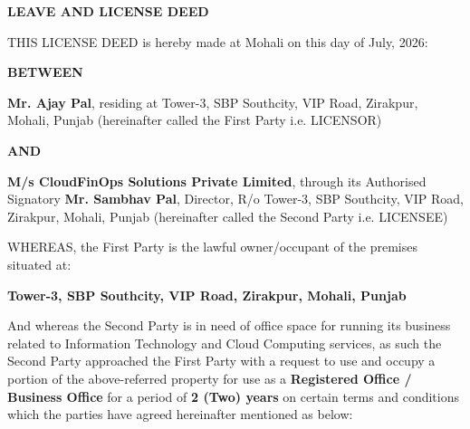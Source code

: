 \documentclass[a4paper,12pt]{article}
\begin{document}
\begin{center}
{\Large\bfseries LEAVE AND LICENSE DEED}
\end{center}

\vspace{0.8cm}

THIS LICENSE DEED is hereby made at Mohali on this \underline{\hspace{2cm}} day of July, 2026:

\vspace{0.5cm}

\noindent\textbf{BETWEEN}

\vspace{0.3cm}

\noindent\textbf{Mr. Ajay Pal}, residing at Tower-3, SBP Southcity, VIP Road, Zirakpur, Mohali, Punjab (hereinafter called the First Party i.e. LICENSOR)

\vspace{0.3cm}

\noindent\textbf{AND}

\vspace{0.3cm}

\noindent\textbf{M/s CloudFinOps Solutions Private Limited}, through its Authorised Signatory \textbf{Mr. Sambhav Pal}, Director, R/o Tower-3, SBP Southcity, VIP Road, Zirakpur, Mohali, Punjab (hereinafter called the Second Party i.e. LICENSEE)

\vspace{0.5cm}

\noindent WHEREAS, the First Party is the lawful owner/occupant of the premises situated at:

\vspace{0.3cm}

\noindent\textbf{Tower-3, SBP Southcity, VIP Road, Zirakpur, Mohali, Punjab}

\vspace{0.3cm}

\noindent And whereas the Second Party is in need of office space for running its business related to Information Technology and Cloud Computing services, as such the Second Party approached the First Party with a request to use and occupy a portion of the above-referred property for use as a \textbf{Registered Office / Business Office} for a period of \textbf{2 (Two) years} on certain terms and conditions which the parties have agreed hereinafter mentioned as below:

\vspace{0.5cm}
\end{document}
